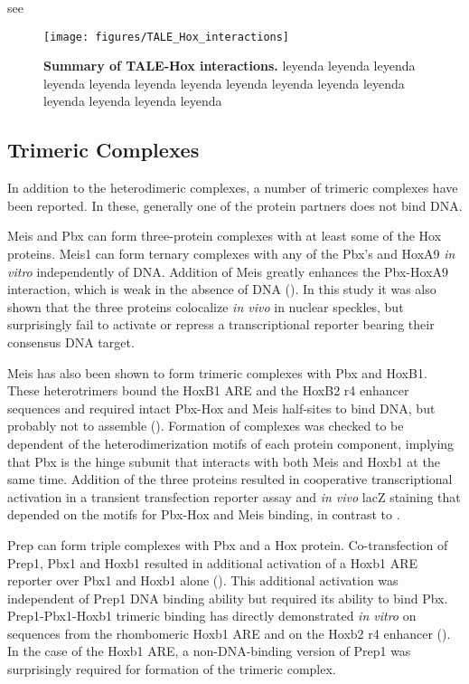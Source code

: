 see \cite{Mann1996}

\begin{figure}[]
  
  \centering
  \texttt{[image: figures/TALE\_Hox\_interactions]}
  \caption[Summary of TALE-Hox interactions]{\textbf{Summary of TALE-Hox interactions.} leyenda leyenda leyenda leyenda leyenda leyenda leyenda leyenda leyenda leyenda leyenda leyenda leyenda leyenda leyenda}
  \label{fig:TALE_Hox_interactions}
\end{figure}


\subsection{Trimeric Complexes}

In addition to the heterodimeric complexes, a number of trimeric complexes have been reported. In these, generally one of the protein partners does not bind DNA. 

Meis and Pbx can form three-protein complexes with at least some of the Hox proteins. Meis1 can form ternary complexes with any of the Pbx's and HoxA9 \textit{in vitro} independently of DNA. Addition of Meis greatly enhances the  Pbx-HoxA9 interaction, which is weak in the absence of DNA (\cite{Shen1999}).  In this study it was also shown that the three proteins colocalize \textit{in vivo} in nuclear speckles, but surprisingly fail to activate or repress a transcriptional reporter bearing their consensus DNA target.

Meis has also been shown to form trimeric complexes with Pbx and HoxB1. These heterotrimers bound the HoxB1 ARE and the HoxB2 r4 enhancer sequences and required intact Pbx-Hox and Meis half-sites to bind DNA, but probably not to assemble (\cite{Jacobs1999}). Formation of complexes was checked to be dependent of the heterodimerization motifs of each protein component, implying that Pbx is the hinge subunit that interacts with both Meis and Hoxb1 at the same time. Addition of the three proteins resulted in cooperative transcriptional activation in a transient transfection reporter assay and \textit{in vivo} lacZ staining that depended on the motifs for Pbx-Hox and Meis binding, in contrast to \cite{Shen1999}. 


Prep can form triple complexes with Pbx and a Hox protein. Co-transfection of Prep1, Pbx1 and Hoxb1 resulted in additional activation of a Hoxb1 \ac{ARE} reporter over Pbx1 and Hoxb1 alone (\cite{Berthelsen1998}). This additional activation was independent of Prep1 DNA binding ability but required its ability to bind Pbx. Prep1-Pbx1-Hoxb1 trimeric binding has directly demonstrated \textit{in vitro} on sequences from the rhombomeric Hoxb1 \ac{ARE} and on the Hoxb2 r4 enhancer (\cite{Ferretti2000}). In the case of the Hoxb1 \ac{ARE}, a non-DNA-binding version of Prep1 was surprisingly required for formation of the trimeric complex.

